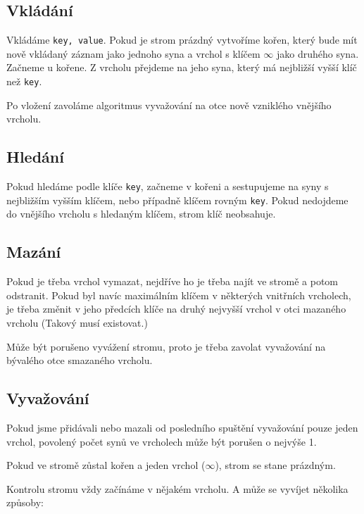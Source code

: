 \documentclass[a4paper,11pt,openany]{article}
\begin{document}
\subsection{Vkládání}
	
Vkládáme \texttt{key, value}.  Pokud  je  strom  prázdný  vytvoříme  kořen,  který  bude  mít  nově  vkládaný záznam jako jednoho syna a vrchol s klíčem $\infty$ jako druhého syna. Začneme u kořene. Z vrcholu přejdeme na jeho syna, který má nejbližší vyšší klíč než \texttt{key}.

Po vložení zavoláme algoritmus vyvažování na otce nově vzniklého vnějšího vrcholu.
	
\subsection{Hledání}

Pokud hledáme podle klíče \texttt{key}, začneme v kořeni a sestupujeme na syny s nejbližším vyšším klíčem, nebo případně klíčem rovným \texttt{key}. Pokud nedojdeme do vnějšího vrcholu s hledaným klíčem, strom klíč neobsahuje.

\subsection{Mazání}

Pokud je třeba vrchol vymazat, nejdříve ho je třeba najít ve stromě a potom odstranit. Pokud byl navíc maximálním klíčem v některých vnitřních vrcholech, je třeba změnit v jeho předcích klíče na druhý nejvyšší vrchol v otci mazaného vrcholu (Takový musí existovat.)

Může být porušeno vyvážení stromu, proto je třeba zavolat vyvažování na bývalého otce smazaného vrcholu.
	
\subsection{Vyvažování}

Pokud jsme přidávali nebo mazali od posledního spuštění vyvažování pouze jeden vrchol, povolený počet synů ve vrcholech může být porušen o nejvýše 1.

Pokud ve stromě zůstal kořen a jeden vrchol ($\infty$), strom se stane prázdným.

Kontrolu stromu vždy začínáme v nějakém vrcholu. A může se vyvíjet několika způsoby:
\end{document}
